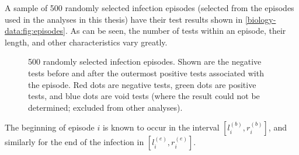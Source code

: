 \documentclass[thesis.tex]{subfiles}
\begin{document}
A sample of 500 randomly selected infection episodes (selected from the episodes used in the analyses in this thesis) have their test results shown in \cref{biology-data:fig:episodes}.
As can be seen, the number of tests within an episode, their length, and other characteristics vary greatly.
\begin{figure}
  \vspace{-5cm}
  \caption[CIS infection episodes]{%
    500 randomly selected infection episodes.
    Shown are the negative tests before and after the outermost positive tests associated with the episode.
    Red dots are negative tests, green dots are positive tests, and blue dots are void tests (where the result could not be determined; excluded from other analyses).
  }
\end{figure}


The beginning of episode $i$ is known to occur in the interval $[l_i^{(b)}, r_i^{(b)}]$, and similarly for the end of the infection in $[l_i^{(e)}, r_i^{(e)}]$.

\ifSubfilesClassLoaded{
  \listoftodos
}{}
\end{document}
